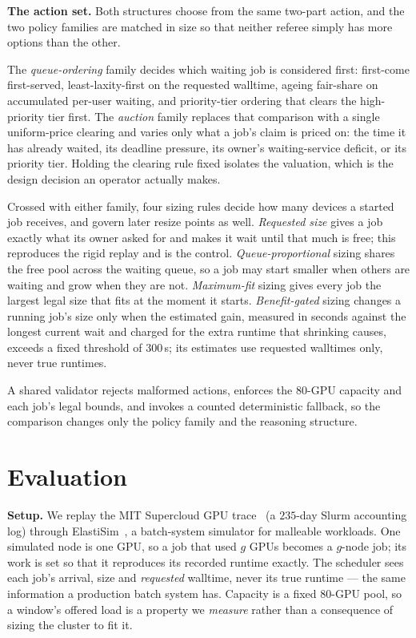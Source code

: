 \documentclass[conference]{IEEEtran}
\begin{document}
\textbf{The action set.} Both structures choose from the same two-part action, and the two policy
families are matched in size so that neither referee simply has more options than the other.

The \emph{queue-ordering} family decides which waiting job is considered first: first-come
first-served, least-laxity-first on the requested walltime, ageing fair-share on accumulated
per-user waiting, and priority-tier ordering that clears the high-priority tier first. The
\emph{auction} family replaces that comparison with a single uniform-price clearing and varies only
what a job's claim is priced on: the time it has already waited, its deadline pressure, its owner's
waiting-service deficit, or its priority tier. Holding the clearing rule fixed isolates the
valuation, which is the design decision an operator actually makes.

Crossed with either family, four sizing rules decide how many devices a started job receives, and
govern later resize points as well. \emph{Requested size} gives a job exactly what its owner asked
for and makes it wait until that much is free; this reproduces the rigid replay and is the control.
\emph{Queue-proportional} sizing shares the free pool across the waiting queue, so a job may start
smaller when others are waiting and grow when they are not. \emph{Maximum-fit} sizing gives every
job the largest legal size that fits at the moment it starts. \emph{Benefit-gated} sizing changes a
running job's size only when the estimated gain, measured in seconds against the longest current
wait and charged for the extra runtime that shrinking causes, exceeds a fixed threshold of $300$\,s;
its estimates use requested walltimes only, never true runtimes.

A shared validator rejects malformed actions, enforces the $80$-GPU capacity and each job's legal
bounds, and invokes a counted deterministic fallback, so the comparison changes only the policy
family and the reasoning structure.

\section{Evaluation}
\label{sec:eval}

\textbf{Setup.} We replay the MIT Supercloud GPU trace~\cite{supercloud} (a $235$-day Slurm accounting log)
through ElastiSim~\cite{elastisim}, a batch-system simulator for malleable workloads. One
simulated node is one GPU, so a job that used $g$ GPUs becomes a $g$-node job; its work is set
so that it reproduces its recorded runtime exactly. The scheduler sees each job's arrival, size
and \emph{requested} walltime, never its true runtime --- the same information a production
batch system has. Capacity is a fixed $80$-GPU pool, so a window's offered load is a property
we \emph{measure} rather than a consequence of sizing the cluster to fit it.
\end{document}
